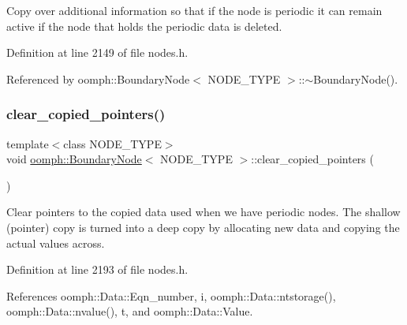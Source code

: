 Copy over additional information so that if the node is periodic it can remain active if the node that holds the periodic data is deleted. 



Definition at line 2149 of file nodes.\+h.



Referenced by oomph\+::\+Boundary\+Node$<$ N\+O\+D\+E\+\_\+\+T\+Y\+P\+E $>$\+::$\sim$\+Boundary\+Node().

\mbox{\label{classoomph_1_1BoundaryNode_a8310f571e69ee1d3f9de4fd4ac32c656}} 
\subsubsection{\texorpdfstring{clear\+\_\+copied\+\_\+pointers()}{clear\_copied\_pointers()}}
{\footnotesize\ttfamily template$<$class N\+O\+D\+E\+\_\+\+T\+Y\+PE$>$ \\
void \hyperlink{classoomph_1_1BoundaryNode}{oomph\+::\+Boundary\+Node}$<$ N\+O\+D\+E\+\_\+\+T\+Y\+PE $>$\+::clear\+\_\+copied\+\_\+pointers (\begin{DoxyParamCaption}{ }\end{DoxyParamCaption})\hspace{0.3cm}{\ttfamily [inline]}}



Clear pointers to the copied data used when we have periodic nodes. The shallow (pointer) copy is turned into a deep copy by allocating new data and copying the actual values across. 



Definition at line 2193 of file nodes.\+h.



References oomph\+::\+Data\+::\+Eqn\+\_\+number, i, oomph\+::\+Data\+::ntstorage(), oomph\+::\+Data\+::nvalue(), t, and oomph\+::\+Data\+::\+Value.

\mbox{\label{classoomph_1_1BoundaryNode_a37a3162c70bd12ab77d697a5ba35a789}} 
